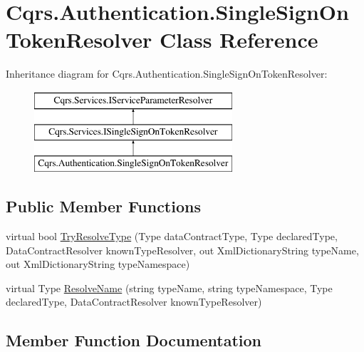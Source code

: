 \hypertarget{classCqrs_1_1Authentication_1_1SingleSignOnTokenResolver}{}\section{Cqrs.\+Authentication.\+Single\+Sign\+On\+Token\+Resolver Class Reference}
\label{classCqrs_1_1Authentication_1_1SingleSignOnTokenResolver}
Inheritance diagram for Cqrs.\+Authentication.\+Single\+Sign\+On\+Token\+Resolver\+:\begin{figure}[H]
\begin{center}
\leavevmode
\includegraphics[height=3.000000cm]{classCqrs_1_1Authentication_1_1SingleSignOnTokenResolver}
\end{center}
\end{figure}
\subsection*{Public Member Functions}
\begin{DoxyCompactItemize}
\item 
virtual bool \hyperlink{classCqrs_1_1Authentication_1_1SingleSignOnTokenResolver_af474315b8fc66d17d64460fab8c63dd1_af474315b8fc66d17d64460fab8c63dd1}{Try\+Resolve\+Type} (Type data\+Contract\+Type, Type declared\+Type, Data\+Contract\+Resolver known\+Type\+Resolver, out Xml\+Dictionary\+String type\+Name, out Xml\+Dictionary\+String type\+Namespace)
\item 
virtual Type \hyperlink{classCqrs_1_1Authentication_1_1SingleSignOnTokenResolver_abd546dcdabb00db2e8d0288cbe373895_abd546dcdabb00db2e8d0288cbe373895}{Resolve\+Name} (string type\+Name, string type\+Namespace, Type declared\+Type, Data\+Contract\+Resolver known\+Type\+Resolver)
\end{DoxyCompactItemize}


\subsection{Member Function Documentation}
\mbox{\label{classCqrs_1_1Authentication_1_1SingleSignOnTokenResolver_abd546dcdabb00db2e8d0288cbe373895_abd546dcdabb00db2e8d0288cbe373895}} 
